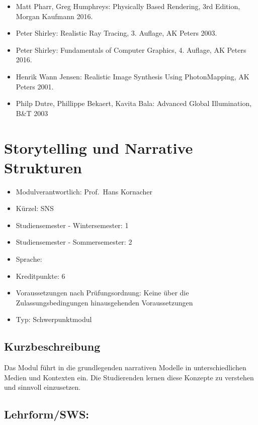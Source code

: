 \begin{itemize}
\tightlist
\item
  Matt Pharr, Greg Humphreys: Physically Based Rendering, 3rd Edition,
  Morgan Kaufmann 2016.
\item
  Peter Shirley: Realistic Ray Tracing, 3. Auflage, AK Peters 2003.
\item
  Peter Shirley: Fundamentals of Computer Graphics, 4. Auflage, AK
  Peters 2016.
\item
  Henrik Wann Jensen: Realistic Image Synthesis Using PhotonMapping, AK
  Peters 2001.
\item
  Philp Dutre, Phillippe Bekaert, Kavita Bala: Advanced Global
  Illumination, B\&T 2003
\end{itemize}

\chapter{Storytelling und Narrative
Strukturen}\label{storytelling-und-narrative-strukturen}

\begin{itemize}
\tightlist
\item
  Modulverantwortlich: Prof.~Hans Kornacher
\item
  Kürzel: SNS
\item
  Studiensemester - Wintersemester: 1
\item
  Studiensemester - Sommersemester: 2
\item
  Sprache: ~
\item
  Kreditpunkte: 6
\item
  Voraussetzungen nach Prüfungsordnung: Keine über die
  Zulassungsbedingungen hinausgehenden Voraussetzungen
\item
  Typ: Schwerpunktmodul
\end{itemize}

\section*{Kurzbeschreibung}\label{kurzbeschreibung-8}

Das Modul führt in die grundlegenden narrativen Modelle in
unterschiedlichen Medien und Kontexten ein. Die Studierenden lernen
diese Konzepte zu verstehen und sinnvoll einzusetzen.

\section*{Lehrform/SWS:}\label{lehrformsws-17}

